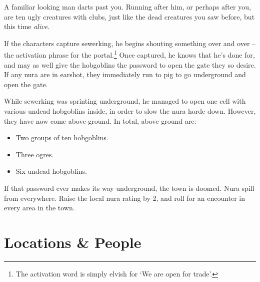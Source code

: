 \begin{multicols}{2}
\begin{speechtext}

	A familiar looking man darts past you.
	Running after him, or perhaps after you, are ten ugly creatures with clubs, just like the dead creatures you saw before, but this time \emph{alive}.

\end{speechtext}


\deephobgoblin

If the characters capture \gls{sewerking}, he begins shouting something over and over -- the activation phrase for the portal.\footnote{The activation word is simply elvish for `We are open for trade'.}  Once captured, he knows that he's done for, and may as well give the hobgoblins the password to open the gate they so desire.  If any nura are in earshot, they immediately run to \gls{pig} to go underground and open the gate.

While \gls{sewerking} was sprinting underground, he managed to open one cell with various undead hobgoblins inside, in order to slow the nura horde down.  However, they have now come above ground.  In total, above ground are:

\begin{itemize}

	\item{Two groups of ten hobgoblins.}
	\item{Three ogres.}
	\item{Six undead hobgoblins.}
\end{itemize}

\undeadhobgoblin

If that password ever makes its way underground, the town is doomed.
Nura spill from everywhere.
Raise the local nura rating by 2, and roll for an encounter in every area in the town.

\end{multicols}

\section{Locations \& People}

